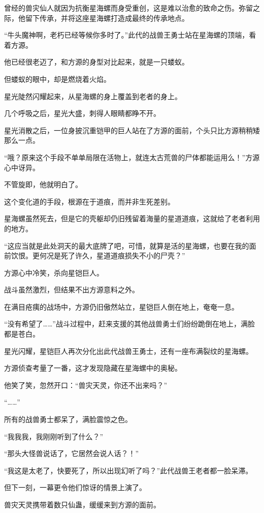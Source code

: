 \begin{this_body}
曾经的兽灾仙人就因为抗衡星海螺而身受重创，这是难以治愈的致命之伤。弥留之际，他留下传承，并将这座星海螺打造成最终的传承地点。

“牛头魔神啊，老朽已经等候你多时了。”此代的战兽王勇士站在星海螺的顶端，看着方源。

他已经很老迈了，和方源的身型对比起来，就是一只蝼蚁。

但蝼蚁的眼中，却是燃烧着火焰。

星光陡然闪耀起来，从星海螺的身上覆盖到老者的身上。

几个呼吸之后，星光大盛，刺得人眼睛都睁不开。

星光消散之后，一位身披沉重铠甲的巨人站在了方源的面前，个头只比方源稍稍矮那么一点。

“哦？原来这个手段不单单局限在活物上，就连太古荒兽的尸体都能运用么！”方源心中讶异。

不管旋即，他就明白了。

这个变化道的手段，根源在于道痕，而并非生死差别。

星海螺虽然死去，但是它的壳躯却仍旧残留着海量的星道道痕，这就给了老者利用的地方。

“这应当就是此处洞天的最大底牌了吧，可惜，就算是活的星海螺，也要在我的面前饮恨。更何况是死了许久，星道道痕损失不小的尸壳？”

方源心中冷笑，杀向星铠巨人。

战斗虽然激烈，但结果不出方源意料之外。

在满目疮痍的战场中，方源仍旧傲然站立，星铠巨人倒在地上，奄奄一息。

“没有希望了……”战斗过程中，赶来支援的其他战兽勇士们纷纷跪倒在地上，满脸都是苍白。

星光闪耀，星铠巨人再次分化出此代战兽王勇士，还有一座布满裂纹的星海螺。

方源侦查考量了一番，这才发现隐藏在星海螺中的奥秘。

他笑了笑，忽然开口：“兽灾天灵，你还不出来吗？”

“……”

所有的战兽勇士都呆了，满脸震惊之色。

“我我我，我刚刚听到了什么？”

“那头大怪兽说话了，它居然会说人话？！”

“我这是太老了，快要死了，所以出现幻听了吗？”此代战兽王老者都一脸呆滞。

但下一刻，一幕更令他们惊讶的情景上演了。

兽灾天灵携带着数只仙蛊，缓缓来到方源的面前。


\end{this_body}
